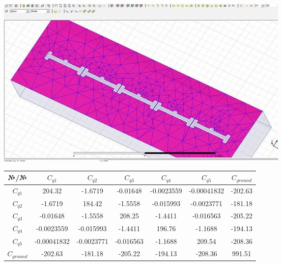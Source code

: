 \documentclass[a0, portrait]{a0poster}
\begin{document}
\begin{multicols}{2}
\begin{tcolorbox}[left=1cm, right=1cm, top=0.5cm, bottom=0.5cm, 
	title={\Large Расчет емкостей в ANSYS Maxwell}, bottomtitle=.3cm,toptitle=.5cm
	]
	
	\vspace{1cm}
	\begin{minipage}{\textwidth}
		\centering
		\includegraphics[width=\textwidth]{maxw1}
		\begingroup
		\captionsetup[figure]{width=\textwidth}
		
		\endgroup
	\end{minipage}


		\centering
		\vspace{1cm}

		\begin{tabular}{|c|c|c|c|c|c|c|}
			\hline
			№/№ & $C_{q1}$ & $C_{q2}$ & $C_{q3}$ & $C_{q4}$ & $C_{q5}$ & $C_{ground}$ \\
			\hline
			$C_{q1}$ & 204.32 & -1.6719 & -0.01648 & -0.0023559 & -0.00041832 & -202.63  \\
			\hline
			$C_{q2}$ & -1.6719 & 184.42 & -1.5558 & -0.015993 & -0.0023771 & -181.18\\ 
			\hline
			$C_{q3}$  & -0.01648 & -1.5558 & 208.25 & -1.4411 & -0.016563 & -205.22\\
			\hline
			$C_{q4}$  & -0.0023559 & -0.015993 & -1.4411 & 196.76 & -1.1688 & -194.13\\
			\hline
			$C_{q5}$  & -0.00041832 & -0.0023771 & -0.016563 & -1.1688 & 209.54 & -208.36\\
			\hline
			$C_{ground}$  & -202.63 & -181.18 & -205.22 & -194.13 & -208.36 & 991.51\\
			\hline
		\end{tabular}

	

	
\end{tcolorbox}





\end{multicols}
\end{document}
